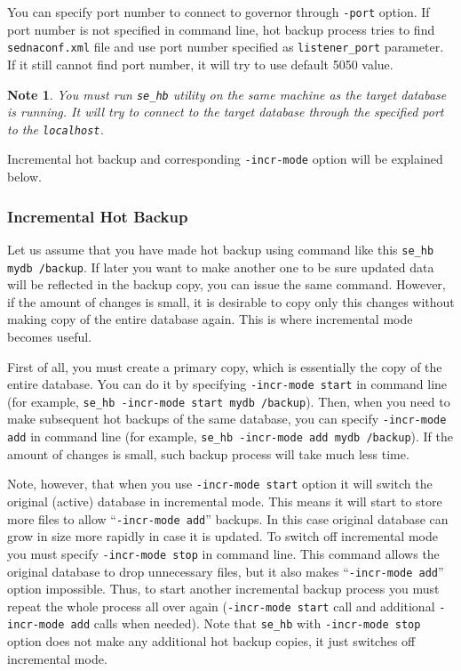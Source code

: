\documentclass[a4paper,12pt]{article}
\newtheorem{note}{Note}    %
\begin{document}
You can specify port number to connect to governor through \verb!-port! option.
If port number is not specified in command line, hot backup process tries to
find \verb!sednaconf.xml! file and use port number specified as
\verb!listener_port! parameter. If it still cannot find port number, it will try
to use default 5050 value.

\begin{note}
You must run \verb!se_hb! utility on the same machine as the target database is
running. It will try to connect to the target database through the specified
port to the \verb!localhost!.
\end{note}

Incremental hot backup and corresponding \verb!-incr-mode! option will be
explained below.


\subsubsection*{Incremental Hot Backup}

Let us assume that you have made hot backup using command like this 
\verb!se_hb mydb /backup!. If later you want to make another one to be sure
updated data will be reflected in the backup copy, you can issue the same
command. However, if the amount of changes is small, it is desirable to copy
only this changes without making copy of the entire database again. This is
where incremental mode becomes useful.

First of all, you must create a primary copy, which is essentially the copy of
the entire database. You can do it by specifying \verb!-incr-mode start! in
command line (for example, \verb!se_hb -incr-mode start mydb /backup!). Then,
when you need to make subsequent hot backups of the same database, you can
specify \verb!-incr-mode add! in command line (for example, 
\verb!se_hb -incr-mode add mydb /backup!). If the amount of changes is small,
such backup process will take much less time.

Note, however, that when you use \verb!-incr-mode start! option it will switch
the original (active) database in incremental mode. This means it will start to
store more files to allow ``\verb!-incr-mode add!'' backups. In this case
original database can grow in size more rapidly in case it is updated. To switch
off incremental mode you must specify \verb!-incr-mode stop! in command line.
This command allows the original database to drop unnecessary files, but it also
makes ``\verb!-incr-mode add!'' option impossible. Thus, to start another
incremental backup process you must repeat the whole process all over again
(\verb!-incr-mode start! call and additional \verb!-incr-mode add! calls when
needed). Note that \verb!se_hb! with \verb!-incr-mode stop! option does not make
any additional hot backup copies, it just switches off incremental mode.
\end{document}
